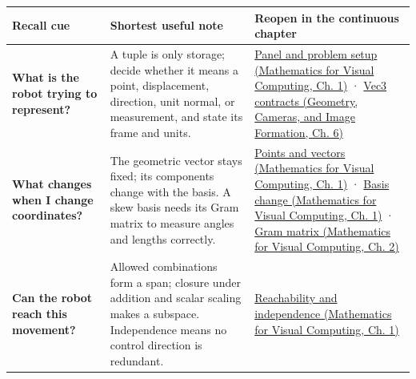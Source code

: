 {\def\LTcaptype{none} %
\begin{longtable}[]{@{}
  >{\raggedright\arraybackslash}p{}
  >{\raggedright\arraybackslash}p{}
  >{\raggedright\arraybackslash}p{}@{}}
\toprule\noalign{}
\begin{minipage}[b]{\linewidth}\raggedright
Recall cue
\end{minipage} & \begin{minipage}[b]{\linewidth}\raggedright
Shortest useful note
\end{minipage} & \begin{minipage}[b]{\linewidth}\raggedright
Reopen in the continuous chapter
\end{minipage} \\
\midrule\noalign{}
\endhead
\bottomrule\noalign{}
\endlastfoot
\textbf{What is the robot trying to represent?} & A tuple is only storage; decide whether it means a point, displacement, direction, unit normal, or measurement, and state its frame and units. & \href{../02-Mathematics-for-Visual-Computing/main.pdf\#nameddest=01-foundations-i-ch017-the-panel-gives-us-a-reason-to-learn}{Panel and problem setup (Mathematics for Visual Computing, Ch. 1)} · \href{../03-Geometry-Cameras-and-Image-Formation/main.pdf\#nameddest=02-foundations-ii-ch037-three-stored-numbers-are-not-the-complete-contract}{Vec3 contracts (Geometry, Cameras, and Image Formation, Ch. 6)} \\
\textbf{What changes when I change coordinates?} & The geometric vector stays fixed; its components change with the basis. A skew basis needs its Gram matrix to measure angles and lengths correctly. & \href{../02-Mathematics-for-Visual-Computing/main.pdf\#nameddest=01-foundations-i-ch017-an-arrow-is-not-the-address-written-beside-it}{Points and vectors (Mathematics for Visual Computing, Ch. 1)} · \href{../02-Mathematics-for-Visual-Computing/main.pdf\#nameddest=01-foundations-i-ch017-a-basis-is-a-measuring-arrangement-not-the-vector-itself}{Basis change (Mathematics for Visual Computing, Ch. 1)} · \href{../02-Mathematics-for-Visual-Computing/main.pdf\#nameddest=01-foundations-i-ch018-a-gram-matrix-remembers-the-geometry-of-a-slanted-basis}{Gram matrix (Mathematics for Visual Computing, Ch. 2)} \\
\textbf{Can the robot reach this movement?} & Allowed combinations form a span; closure under addition and scalar scaling makes a subspace. Independence means no control direction is redundant. & \href{../02-Mathematics-for-Visual-Computing/main.pdf\#nameddest=01-foundations-i-ch017-the-reachable-movements-form-a-vector-space}{Reachability and independence (Mathematics for Visual Computing, Ch. 1)} \\

\end{longtable}}

